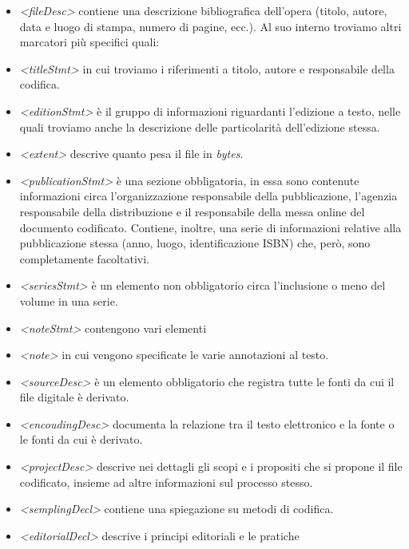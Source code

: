 \documentclass[
  b5paper,
  twoside,
  12pt,
  chapterprefix=false,
  bibliography=totocnumbered,
  parskip=false]{scrbook}
\begin{document}
\begin{itemize}
\item
  \emph{\textless fileDesc\textgreater{}} contiene una descrizione bibliografica dell'opera
  (titolo, autore, data e luogo di stampa, numero di pagine, ecc.). Al
  suo interno troviamo altri marcatori più specifici quali:
\item
  \emph{\textless titleStmt\textgreater{}} in cui troviamo i riferimenti a titolo, autore e
  responsabile della codifica.
\item
  \emph{\textless editionStmt\textgreater{}} è il gruppo di informazioni riguardanti l'edizione a
  testo, nelle quali troviamo anche la descrizione delle particolarità
  dell'edizione stessa.
\item
  \emph{\textless extent\textgreater{}} descrive quanto pesa il file in \emph{bytes}.
\item
  \emph{\textless publicationStmt\textgreater{}} è una sezione obbligatoria, in essa sono contenute
  informazioni circa l'organizzazione responsabile della pubblicazione,
  l'agenzia responsabile della distribuzione e il responsabile della messa
  online del documento codificato. Contiene, inoltre, una serie di
  informazioni relative alla pubblicazione stessa (anno, luogo,
  identificazione ISBN) che, però, sono completamente facoltativi.
\item
  \emph{\textless seriesStmt\textgreater{}} è un elemento non obbligatorio circa l'inclusione o
  meno del volume in una serie.
\item
  \emph{\textless noteStmt\textgreater{}} contengono vari elementi
\item
  \emph{\textless note\textgreater{}} in cui vengono
  specificate le varie annotazioni al testo.
\item
  \emph{\textless sourceDesc\textgreater{}} è un elemento obbligatorio che registra tutte le fonti
  da cui il file digitale è derivato.
\item
  \emph{\textless encoudingDesc\textgreater{}} documenta la relazione tra il testo elettronico
  e la fonte o le fonti da cui è derivato.
\item
  \emph{\textless projectDesc\textgreater{}} descrive nei dettagli gli scopi e i propositi che si
  propone il file codificato, insieme ad altre informazioni sul processo
  stesso.
\item
  \emph{\textless semplingDecl\textgreater{}} contiene una spiegazione su metodi di codifica.
\item
  \emph{\textless editorialDecl\textgreater{}} descrive i principi editoriali e le pratiche

\end{itemize}
\end{document}
